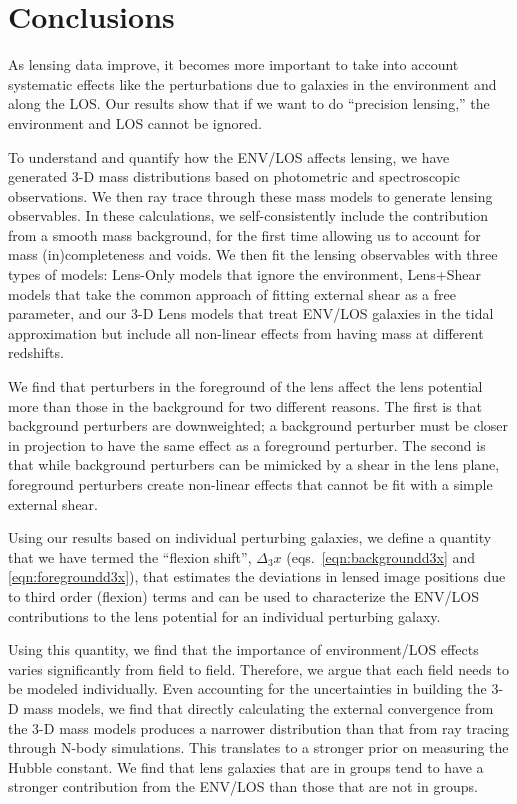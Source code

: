 \documentclass{emulateapj}
\begin{document}
\section{Conclusions}

As lensing data improve, it becomes more important to take into account systematic effects like the perturbations due to galaxies in the environment and along the LOS. Our results show that if we want to do ``precision lensing,'' the environment and LOS cannot be ignored.

To understand and quantify how the ENV/LOS affects lensing, we have generated 3-D mass distributions based on photometric and spectroscopic observations. We then ray trace through these mass models to generate lensing observables. In these calculations, we self-consistently include the contribution from a smooth mass background, for the first time allowing us to account for mass (in)completeness and voids. We then fit the lensing observables with three types of models: Lens-Only models that ignore the environment, Lens+Shear models that take the common approach of fitting external shear as a free parameter, and our 3-D Lens models that treat ENV/LOS galaxies in the tidal approximation but include all non-linear effects from having mass at different redshifts.

We find that perturbers in the foreground of the lens affect the lens potential more than those in the background for two different reasons. The first is that background perturbers are downweighted; a background perturber must be closer in projection to have the same effect as a foreground perturber. The second is that while background perturbers can be mimicked by a shear in the lens plane, foreground perturbers create non-linear effects that cannot be fit with a simple external shear.

Using our results based on individual perturbing galaxies, we define a quantity that we have termed the ``flexion shift'', $\Delta_3 x$ (eqs.\ \ref{eqn:backgroundd3x} and \ref{eqn:foregroundd3x}), that estimates the deviations in lensed image positions due to third order (flexion) terms and can be used to characterize the ENV/LOS contributions to the lens potential for an individual perturbing galaxy.

Using this quantity, we find that the importance of environment/LOS effects varies significantly from field to field. Therefore, we argue that each field needs to be modeled individually. Even accounting for the uncertainties in building the 3-D mass models, we find that directly calculating the external convergence from the 3-D mass models produces a narrower distribution than that from ray tracing through N-body simulations. This translates to a stronger prior on measuring the Hubble constant. We find that lens galaxies that are in groups tend to have a stronger contribution from the ENV/LOS than those that are not in groups. 
\end{document}
